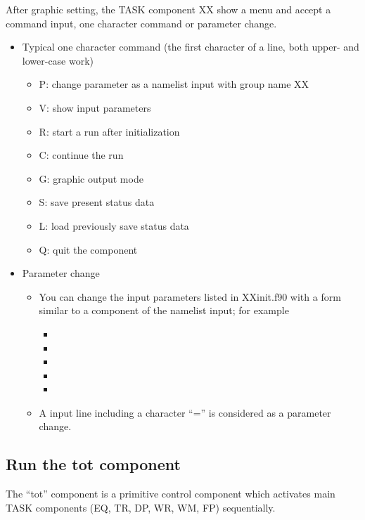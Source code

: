 \documentclass[11pt]{article}
\begin{document}
After graphic setting, the TASK component XX show a menu and accept
a command input, one character command or parameter change.

\begin{itemize}
\item
Typical one character command (the first character of a line, both
upper- and lower-case work)
\begin{itemize}
\item[]
P: change parameter as a namelist input with group name XX
\item[]
V: show input parameters
\item[]
R: start a run after initialization
\item[]
C: continue the run
\item[]
G: graphic output mode
\item[]
S: save present status data
\item[]
L: load previously save status data
\item[]
Q: quit the component
\end{itemize}
\item
Parameter change
\begin{itemize}
\item
You can change the input parameters listed in XXinit.f90 with a form
similar to a component of the namelist input; for example
\begin{itemize}
\item[]
\item[]
\item[]
\item[]
\item[]
\end{itemize}

\item
A input line including a character ``='' is considered as a parameter change.
\end{itemize}
\end{itemize}

\subsection{Run the tot component}

The ``tot'' component is a primitive control component which activates
main TASK components (EQ, TR, DP, WR, WM, FP) sequentially.  
\end{document}
